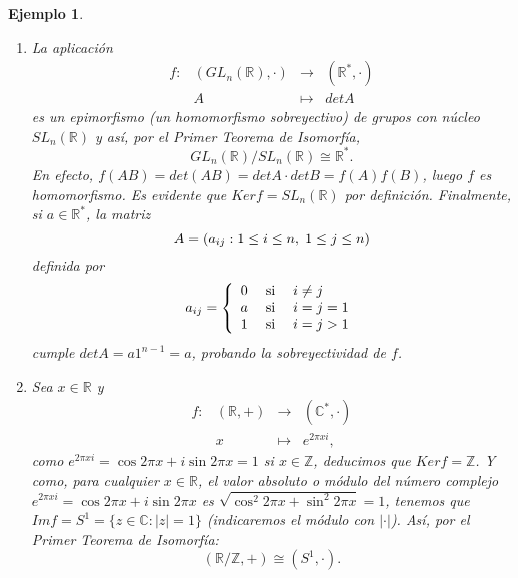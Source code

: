 \documentclass[12pt]{article}
\newtheorem{example}{Ejemplo}[theorem]
\begin{document}
\begin{example}
\begin{enumerate}
Esta aplicación es homomorfismo, ya que $$f(n+m) = (n+m)a = na + ma = f(n) + f(m).$$
Así, los homomorfismos de $\mathbb{Z}$ en $\mathbb{Z}$ son las aplicaciones ($a\in \mathbb{Z}$) $$\begin{array}{rccl}
f_{a}\colon &\mathbb{Z} & \longrightarrow & \mathbb{Z}\\
&n& \longmapsto &na
\end{array}
$$
\item La aplicación $$\begin{array}{rccl}
f\colon &(GL_{n}(\mathbb{R}), \cdot) & \longrightarrow & (\mathbb{R}^{\ast}, \cdot)\\
&A& \longmapsto &det A
\end{array}
$$ es un epimorfismo (un homomorfismo sobreyectivo) de grupos con núcleo $SL_{n}(\mathbb{R})$ y así, por el \textit{Primer Teorema de Isomorfía}, $$GL_{n}(\mathbb{R})/SL_{n}(\mathbb{R}) \cong \mathbb{R}^{\ast}.$$
En efecto, $f(AB) = det(AB) = det A \cdot det B = f(A)f(B)$, luego $f$ es homomorfismo. Es evidente que $Ker f = SL_{n}(\mathbb{R})$ por definición. Finalmente, si $a \in \mathbb{R}^{\ast}$, la matriz $$A = (a_{ij} : 1 \leq i \leq n,\hspace{0.1cm} 1\leq j \leq n)$$ definida por  $$a_{ij} = \left\lbrace \begin{array}{cll} 0\hspace{0.1cm} &\text{si} \hspace{0.1cm} &i\neq j\\ a\hspace{0.1cm} &\text{si} \hspace{0.1cm}  &i=j=1\\1\hspace{0.1cm} &\text{si} \hspace{0.1cm}  &i=j>1  \end{array}\right.$$
cumple $det A = a1^{n-1} = a$, probando la sobreyectividad de $f$.
\item Sea $x \in \mathbb{R}$ y  $$\begin{array}{rccl}
f\colon &(\mathbb{R}, +) & \longrightarrow & (\mathbb{C}^{\ast}, \cdot)\\
&x& \longmapsto &e^{2\pi xi},
\end{array}
$$ como $e^{2\pi xi} = \cos 2\pi x + i\sin 2\pi x = 1$ si $x \in \mathbb{Z}$, deducimos que $Ker f = \mathbb{Z}$. Y como, para cualquier $x \in \mathbb{R}$, el valor absoluto o \textit{módulo} del número complejo $e^{2\pi x i} = \cos 2\pi x + i\sin 2\pi x$ es $\sqrt{\cos^{2} 2 \pi x +\sin^{2} 2\pi x} = 1$, tenemos que $Im f = S^{1} = \lbrace z \in \mathbb{C}: |z| = 1\rbrace$ (indicaremos el módulo con $|\cdot |$). Así, por el \textit{Primer Teorema de Isomorfía}: $$(\mathbb{R}/\mathbb{Z},+) \cong (S^{1}, \cdot).$$

\end{enumerate}
\end{example}
\end{document}
